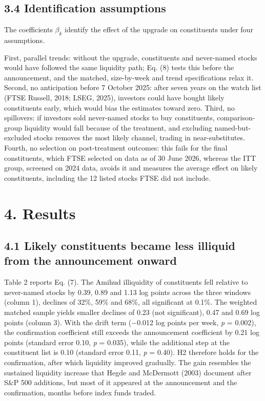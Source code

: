 \documentclass[review,authoryear,12pt]{elsarticle}
\begin{document}
\hypertarget{identification-assumptions}{%
\subsection*{3.4 Identification
assumptions}}

The coefficients \(\beta_k\) identify the effect of the upgrade on
constituents under four assumptions.

First, parallel trends: without the upgrade, constituents and
never-named stocks would have followed the same liquidity path; Eq. (8)
tests this before the announcement, and the matched, size-by-week and
trend specifications relax it. Second, no anticipation before 7 October
2025: after seven years on the watch list (FTSE Russell, 2018; LSEG,
2025), investors could have bought likely constituents early, which
would bias the estimates toward zero. Third, no spillovers: if investors
sold never-named stocks to buy constituents, comparison-group liquidity
would fall because of the treatment, and excluding named-but-excluded
stocks removes the most likely channel, trading in near-substitutes.
Fourth, no selection on post-treatment outcomes: this fails for the
final constituents, which FTSE selected on data as of 30 June 2026,
whereas the ITT group, screened on 2024 data, avoids it and measures the
average effect on likely constituents, including the 12 listed stocks
FTSE did not include.

\hypertarget{results}{%
\section*{4. Results}}

\hypertarget{likely-constituents-became-less-illiquid-from-the-announcement-onward}{%
\subsection*{4.1 Likely constituents became less illiquid from the
announcement
onward}}

Table 2 reports Eq. (7). The Amihud illiquidity of constituents fell
relative to never-named stocks by 0.39, 0.89 and 1.13 log points across
the three windows (column 1), declines of 32\%, 59\% and 68\%, all
significant at 0.1\%. The weighted matched sample yields smaller
declines of 0.23 (not significant), 0.47 and 0.69 log points (column 3).
With the drift term (−0.012 log points per week, \emph{p} = 0.002), the
confirmation coefficient still exceeds the announcement coefficient by
0.21 log points (standard error 0.10, \emph{p} = 0.035), while the
additional step at the constituent list is 0.10 (standard error 0.11,
\emph{p} = 0.40). H2 therefore holds for the confirmation, after which
liquidity improved gradually. The gain resembles the sustained liquidity
increase that Hegde and McDermott (2003) document after S\&P 500
additions, but most of it appeared at the announcement and the
confirmation, months before index funds traded.
\end{document}
